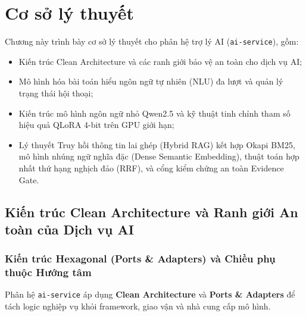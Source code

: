 \chapter{Cơ sở lý thuyết}
\label{chap:theory}

Chương này trình bày cơ sở lý thuyết cho phân hệ trợ lý AI (\texttt{ai-service}), gồm:
\begin{itemize}[nosep]
  \item Kiến trúc Clean Architecture và các ranh giới bảo vệ an toàn cho dịch vụ AI;
  \item Mô hình hóa bài toán hiểu ngôn ngữ tự nhiên (NLU) đa lượt và quản lý trạng thái hội thoại;
  \item Kiến trúc mô hình ngôn ngữ nhỏ Qwen2.5 và kỹ thuật tinh chỉnh tham số hiệu quả QLoRA 4-bit trên GPU giới hạn;
  \item Lý thuyết Truy hồi thông tin lai ghép (Hybrid RAG) kết hợp Okapi BM25, mô hình nhúng ngữ nghĩa đặc (Dense Semantic Embedding), thuật toán hợp nhất thứ hạng nghịch đảo (RRF), và cổng kiểm chứng an toàn Evidence Gate.
\end{itemize}

\section{Kiến trúc Clean Architecture và Ranh giới An toàn của Dịch vụ AI}
\label{sec:theory_system_arch}

\subsection{Kiến trúc Hexagonal (Ports \& Adapters) và Chiều phụ thuộc Hướng tâm}

Phân hệ \texttt{ai-service} áp dụng \textbf{Clean Architecture} \cite{clean_arch_martin_2017} và \textbf{Ports \& Adapters} để tách logic nghiệp vụ khỏi framework, giao vận và nhà cung cấp mô hình.

